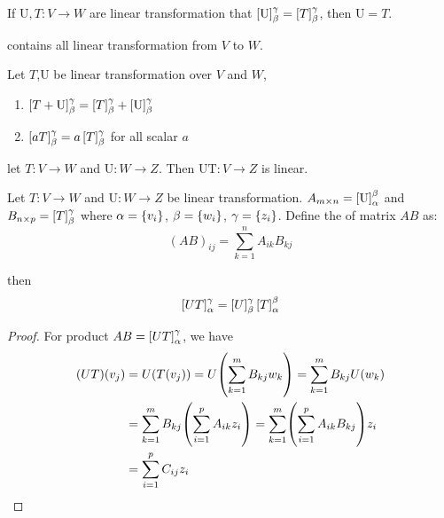 \begin{theorem}
	If $\mathrm{U},T:V \rightarrow W$ are linear transformation that $\coordinate{\mathrm{U}}_\beta^\gamma = \coordinate{T}_\beta^\gamma$, then $\mathrm{U} = T$.
\end{theorem}

\begin{definition}
	 contains all linear transformation from $V$ to $W$.
\end{definition}

\begin{theorem}
	Let $T$,$\mathrm{U}$ be linear transformation over $V$ and $W$, 
	\begin{enumerate}
		\item $\coordinate{T + \mathrm{U}}_\beta^\gamma = \coordinate{T}_\beta^\gamma  + \coordinate{\mathrm{U}}_\beta^\gamma $
		\item $\coordinate{a T }_\beta^\gamma = a \coordinate{T}_\beta^\gamma $ for all scalar $a$
	\end{enumerate}
\end{theorem}

\begin{theorem}
	let $T:V\rightarrow W$ and $\mathrm{U}:W\rightarrow Z$. Then $\mathrm{UT}: V \rightarrow Z$ is linear.
\end{theorem}

\begin{definition}
	Let $T:V\rightarrow W$ and $\mathrm{U}:W\rightarrow Z$ be linear transformation. $A_{m \times n}=\coordinate{\mathrm{U}}_\alpha^\beta$ and $B_{n \times p}=\coordinate{T}_\beta^\gamma$ where $\alpha=\set{v_i}$, $\beta=\set{w_i}$, $\gamma=\set{z_i}$. Define the  of matrix $AB$ as:
	\begin{equation}
		(AB)_{ij} = \sum_{k=1}^n A_{ik} B_{kj}
	\end{equation}
	
	then 
	\begin{equation}
	    \coordinate{UT}_\alpha^\gamma = \coordinate{U}_\beta^\gamma \coordinate{T}_\alpha^\beta
	\end{equation}
\end{definition}

\begin{proof}
	For product $AB=\coordinate{UT}_\alpha^\gamma$, we have 
	\begin{equation}
		\begin{aligned}
			(UT)(v_j) &= U(T(v_j)) = U \mleft( \sum_{k=1}^m B_{kj} w_k \mright) = \sum_{k=1}^m B_{kj} U(w_k) \\
			&= \sum_{k=1}^m B_{kj} \mleft( \sum_{i=1}^p A_{ik} z_i \mright) = \sum_{k=1}^m  \mleft( \sum_{i=1}^p A_{ik} B_{kj} \mright)  z_i \\
			&= \sum_{i=1}^p C_{ij} z_i
		\end{aligned}
	\end{equation}
\end{proof}


